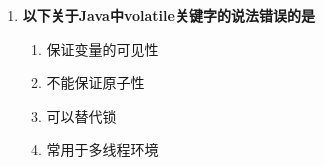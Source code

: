 \documentclass[12pt, a4paper]{ctexart}
\begin{document}
\begin{enumerate}[label=\textbf{\arabic*.}]
\begin{bluebox}{答案与深度解析}
\begin{itemize}[label={}, leftmargin=*, nosep]
		      \item \textbf{D. 锁可能导致死锁 — 正确}
		      \begin{itemize}[label={}, leftmargin=*, nosep]
			      \item \textbf{死锁条件}：
			            \begin{itemize}[label={}, nosep]
				            \item 互斥条件
				            \item 占有并等待
				            \item 不可抢占
				            \item 循环等待
			            \end{itemize}
		      \end{itemize}

		      \end{itemize}

		      \textbf{【应背诵知识点（命题人思维版）】}
		      \begin{enumerate}[label={}, leftmargin=*, nosep]
			      \item \textbf{锁优化策略}：
			            \begin{itemize}[label={}, nosep]
				            \item 减小锁粒度
				            \item 使用读写锁
				            \item 使用ConcurrentHashMap
				            \item 使用原子类
			            \end{itemize}

			      \item \textbf{高频陷阱清单}：
			            \begin{itemize}[label={}, nosep]
				            \item 陷阱1：锁不是越多越好，过度同步降低性能
			            \end{itemize}
		      \end{enumerate}

		      \textbf{【命题趋势与实战策略】}

		      \textbf{考场秒杀技巧}：锁会降低并发性能，不是提高
	      \end{bluebox}

	\item \textbf{以下关于Java中volatile关键字的说法错误的是}
	      \begin{enumerate}[label=\Alph*.]
		      \item 保证变量的可见性
		      \item 不能保证原子性
		      \item 可以替代锁
		      \item 常用于多线程环境
	      \end{enumerate}


\end{enumerate}
\end{document}
